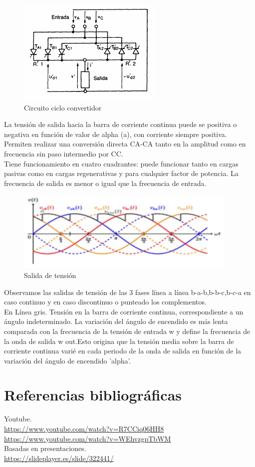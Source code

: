 \documentclass[12pt,a4paper]{article}
\begin{document}
\begin{figure}[hbtp]
\centering
\includegraphics[scale=0.7]{Circuitos/4.png}
\caption{Circuito ciclo convertidor}
\end{figure} 
La tensión de salida hacia la barra de corriente continua puede se positiva o negativa en función de valor de alpha (a), con corriente siempre positiva. 
Permiten realizar una conversión directa CA-CA tanto en la amplitud como en frecuencia sin paso intermedio por CC.\\
Tiene funcionamiento en cuatro cuadrantes: puede funcionar tanto en cargas pasivas como en cargas regenerativas y para cualquier factor de potencia. La frecuencia de salida es menor o igual que la frecuencia de entrada. 

\newpage
\begin{figure}[hbtp]
\centering
\includegraphics[scale=1]{Circuitos/5.png}
\caption{Salida de tensión}
\end{figure}
Observamos las salidas de tensión de las 3 fases línea a línea b-a-b,b-b-c,b-c-a en caso continuo y en caso discontinuo o punteado los complementos.\\
En Línea gris. Tensión en la barra de corriente continua, correspondiente a un ángulo indeterminado.
La variación del ángulo de encendido es más lenta comparada con la frecuencia de la tensión de entrada w y define la frecuencia de la onda de salida w out.Esto origina que la tensión media sobre la barra de corriente continua varié en cada periodo de la onda de salida en función de la variación del ángulo de encendido 'alpha'.

\section*{Referencias bibliográficas}
Youtube.\\
\url{https://www.youtube.com/watch?v=R7CCiq06HH8}\\
\url{https://www.youtube.com/watch?v=WEhvzgpTbWM}\\
 Basadas en presentaciones.\\
\url{https://slideplayer.es/slide/322441/}
 
\end{document}

